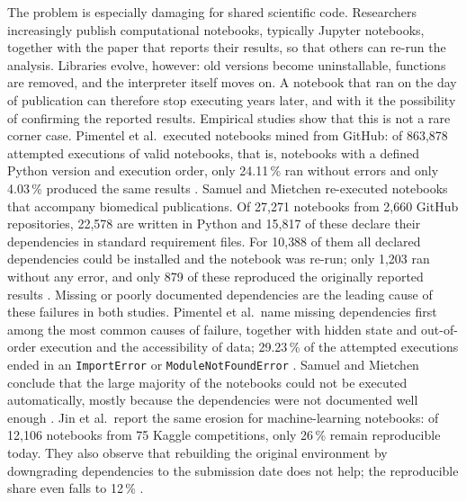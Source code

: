 The problem is especially damaging for shared scientific code. Researchers increasingly publish computational notebooks, typically Jupyter notebooks, together with the paper that reports their results, so that others can re-run the analysis. Libraries evolve, however: old versions become uninstallable, functions are removed, and the interpreter itself moves on. A notebook that ran on the day of publication can therefore stop executing years later, and with it the possibility of confirming the reported results. Empirical studies show that this is not a rare corner case. Pimentel et al.\ executed notebooks mined from GitHub: of 863{,}878 attempted executions of valid notebooks, that is, notebooks with a defined Python version and execution order, only 24.11\,\% ran without errors and only 4.03\,\% produced the same results \cite{pimentel2019large}. Samuel and Mietchen re-executed notebooks that accompany biomedical publications. Of 27{,}271 notebooks from 2{,}660 GitHub repositories, 22{,}578 are written in Python and 15{,}817 of these declare their dependencies in standard requirement files. For 10{,}388 of them all declared dependencies could be installed and the notebook was re-run; only 1{,}203 ran without any error, and only 879 of these reproduced the originally reported results \cite{samuel2024computational}. %
Missing or poorly documented dependencies are the leading cause of these failures in both studies. Pimentel et al.\ name missing dependencies first among the most common causes of failure, together with hidden state and out-of-order execution and the accessibility of data; 29.23\,\% of the attempted executions ended in an \texttt{ImportError} or \texttt{ModuleNotFoundError} \cite{pimentel2019large}. Samuel and Mietchen conclude that the large majority of the notebooks could not be executed automatically, mostly because the dependencies were not documented well enough \cite{samuel2024computational}. %
Jin et al.\ report the same erosion for machine-learning notebooks: of 12{,}106 notebooks from 75 Kaggle competitions, only 26\,\% remain reproducible today. They also observe that rebuilding the original environment by downgrading dependencies to the submission date does not help; the reproducible share even falls to 12\,\% \cite{jin2026modernization}.

